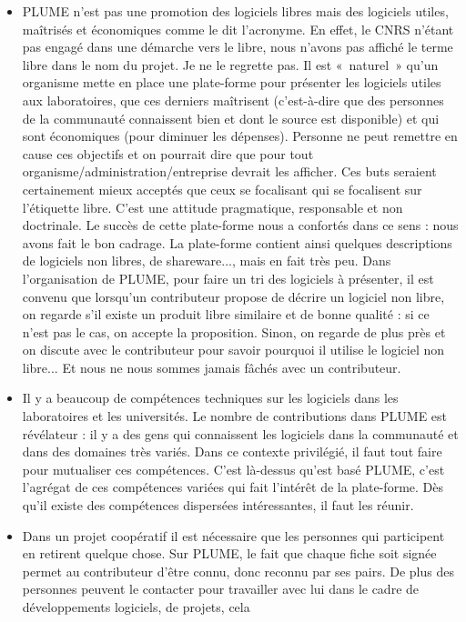 \documentclass{FramateX}
\begin{document}
\begin{refsection}
\begin{itemize}
\item PLUME n'est pas une promotion des logiciels libres mais des
logiciels utiles, maîtrisés et économiques comme le dit l'acronyme. En
effet, le CNRS n'étant pas engagé dans une démarche vers le libre, nous
n'avons pas affiché le terme libre dans le nom du projet. Je ne le
regrette pas. Il est «~naturel~» qu'un organisme mette en place une
plate-forme pour présenter les logiciels utiles aux laboratoires, que
ces derniers maîtrisent (c'est-à-dire que des personnes de la
communauté connaissent bien et dont le source est disponible) et qui
sont économiques (pour diminuer les dépenses). Personne ne peut
remettre en cause ces objectifs et on pourrait dire que pour tout
organisme/administration/entreprise devrait les afficher. Ces buts
seraient certainement mieux acceptés que ceux se focalisant qui se
focalisent sur l'étiquette libre. C'est une attitude pragmatique,
responsable et non doctrinale. Le succès de cette plate-forme nous a
confortés dans ce sens : nous avons fait le bon cadrage. La plate-forme
contient ainsi quelques descriptions de logiciels non libres, de
shareware..., mais en fait très peu. Dans l'organisation de PLUME, pour
faire un tri des logiciels à présenter, il est convenu que lorsqu'un
contributeur propose de décrire un logiciel non libre, on regarde s'il
existe un produit libre similaire et de bonne qualité : si ce n'est pas
le cas, on accepte la proposition. Sinon, on regarde de plus près et on
discute avec le contributeur pour savoir pourquoi il utilise le
logiciel non libre... Et nous ne nous sommes jamais fâchés avec un
contributeur.
\item Il y a beaucoup de compétences techniques sur les logiciels dans
les laboratoires et les universités. Le nombre de contributions dans
PLUME est révélateur : il y a des gens qui connaissent les logiciels
dans la communauté et dans des domaines très variés. Dans ce contexte
privilégié, il faut tout faire pour mutualiser ces compétences. C'est
là-dessus qu'est basé PLUME, c'est l'agrégat de ces compétences variées
qui fait l'intérêt de la plate-forme. Dès qu'il existe des compétences
dispersées intéressantes, il faut les réunir.
\item Dans un projet coopératif il est nécessaire que les personnes qui
participent en retirent quelque chose. Sur PLUME, le fait que chaque
fiche soit signée permet au contributeur d'être connu, donc reconnu par
ses pairs. De plus des personnes peuvent le contacter pour travailler
avec lui dans le cadre de développements logiciels, de projets, cela

\end{itemize}
\end{refsection}
\end{document}

